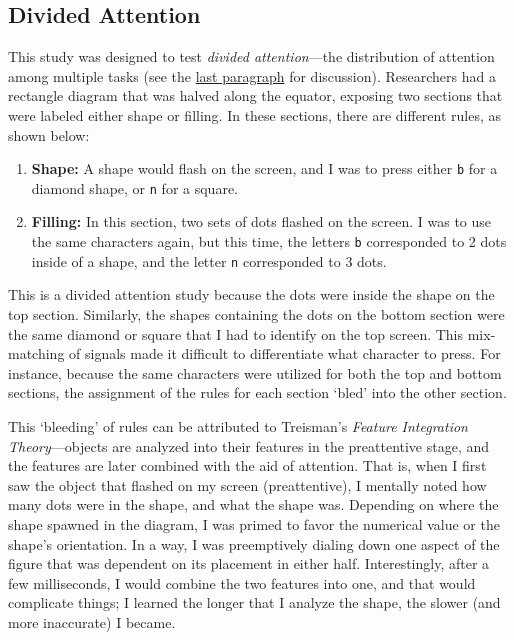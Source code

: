 \documentclass[stu,12pt,floatsintext]{apa7}
\begin{document}
\subsection{Divided Attention}

    This study was designed to test \textit{divided attention}---the distribution of attention among multiple tasks (see the \hyperlink{last}{last paragraph} for discussion). Researchers had a rectangle diagram that was halved along the equator, exposing two sections that were labeled either shape or filling. In these sections, there are different rules, as shown below:
    \begin{enumerate}
        \item \textbf{Shape:} A shape would flash on the screen, and I was to press either \texttt{b} for a diamond shape, or \texttt{n} for a square.
        \item \textbf{Filling:} In this section, two sets of dots flashed on the screen. I was to use the same characters again, but this time, the letters \texttt{b} corresponded to 2 dots inside of a shape, and the letter \texttt{n} corresponded to 3 dots.
    \end{enumerate}
    
    This is a divided attention study because the dots were inside the shape on the top section. Similarly, the shapes containing the dots on the bottom section were the same diamond or square that I had to identify on the top screen. This mix-matching of signals made it difficult to differentiate what character to press. For instance, because the same characters were utilized for both the top and bottom sections, the assignment of the rules for each section `bled' into the other section.
    
    This `bleeding' of rules can be attributed to Treisman's \textit{Feature Integration Theory}---objects are analyzed into their features in the preattentive stage, and the features are later combined with the aid of attention. That is, when I first saw the object that flashed on my screen (preattentive), I mentally noted how many dots were in the shape, and what the shape was. Depending on where the shape spawned in the diagram, I was primed to favor the numerical value or the shape's orientation. In a way, I was preemptively dialing down one aspect of the figure that was dependent on its placement in either half. Interestingly, after a few milliseconds, I would combine the two features into one, and that would complicate things; I learned the longer that I analyze the shape, the slower (and more inaccurate) I became. 
\end{document}
